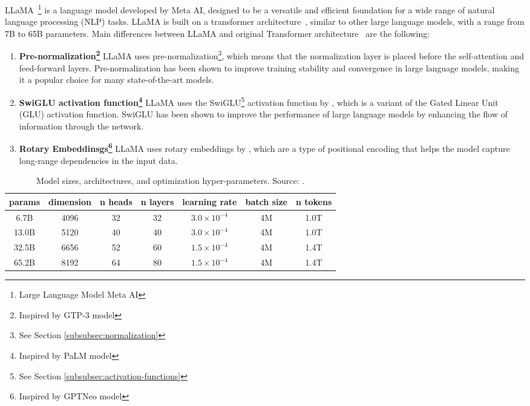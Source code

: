 LLaMA~\footnote{Large Language Model Meta AI} is a language model developed by Meta AI, designed to be a versatile and efficient foundation for a wide range of natural language processing (NLP) tasks.
LLaMA is built on a transformer architecture~\cite{vaswani2023attention}, similar to other large language models, with a range from 7B to 65B parameters.
Main differences between LLaMA and original Transformer architecture~\cite{vaswani2023attention} are the following:
\begin{enumerate}
	\item \textbf{Pre-normalization\footnote{Inspired by GTP-3 model}} {LLaMA uses pre-normalization\footnote{See Section \ref{subsubsec:normalization}}, which means that the normalization layer is placed before the self-attention and feed-forward layers.
		      Pre-normalization has been shown to improve training stability and convergence in large language models, making it a popular choice for many state-of-the-art models.
	      }
	\item \textbf{SwiGLU activation function\footnote{Inspired by PaLM model}} {LLaMA uses the SwiGLU\footnote{See Section \ref{subsubsec:activation-functions}} activation function by \textcite{shazeer2020glu}, which is a variant of the Gated Linear Unit (GLU) activation function.
		      SwiGLU has been shown to improve the performance of large language models by enhancing the flow of information through the network.
	      }
	\item \textbf{Rotary Embeddinsgs\footnote{Inspired by GPTNeo model}} {LLaMA uses rotary embeddings by \textcite{su2021roformer}, which are a type of positional encoding that helps the model capture long-range dependencies in the input data.
	      }
\end{enumerate}

\begin{table}[ht]
	\centering
	\begin{tabular}{@{}ccccccc@{}}
		\toprule
		params & dimension & n heads & n layers & learning rate          & batch size & n tokens \\
		\midrule
		6.7B   & 4096      & 32      & 32       & \(3.0 \times 10^{-4}\) & 4M         & 1.0T     \\
		13.0B  & 5120      & 40      & 40       & \(3.0 \times 10^{-4}\) & 4M         & 1.0T     \\
		32.5B  & 6656      & 52      & 60       & \(1.5 \times 10^{-4}\) & 4M         & 1.4T     \\
		65.2B  & 8192      & 64      & 80       & \(1.5 \times 10^{-4}\) & 4M         & 1.4T     \\
		\bottomrule
	\end{tabular}
	\caption{Model sizes, architectures, and optimization hyper-parameters. Source: \protect\textcite{touvron2023llama}.}
	\label{tab:llama-model-params}
\end{table}

